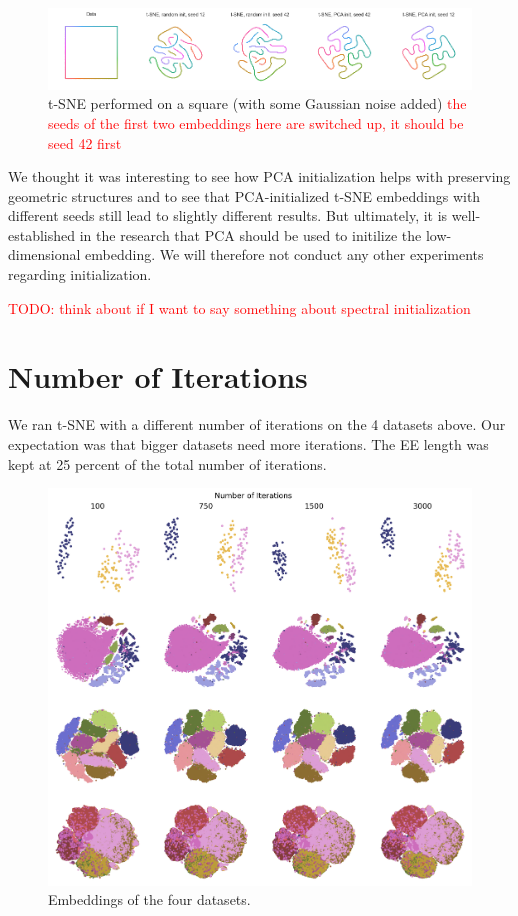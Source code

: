 \begin{figure}[h]
    \centering 
        \includegraphics[width=\linewidth]{figures/t_sne_on_square.png}
        \caption{t-SNE performed on a square (with some Gaussian noise added) \textcolor{red}{the seeds of the first two embeddings here are switched up, it should be seed 42 first}}
    \label{fig:square}
\end{figure}

We thought it was interesting to see how PCA initialization helps with preserving geometric structures and to see that PCA-initialized t-SNE embeddings with different seeds still lead to slightly different results. 
But ultimately, it is well-established in the research that PCA should be used to initilize the low-dimensional embedding. 
We will therefore not conduct any other experiments regarding initialization. 

\textcolor{red}{TODO: think about if I want to say something about spectral initialization}

\section{Number of Iterations}
We ran t-SNE with a different number of iterations on the 4 datasets above. Our expectation was that bigger datasets need more iterations. The EE length was kept at 25 percent of the total number of iterations. 

\begin{figure}[h]
    \centering 
        \includegraphics[width=\linewidth]{figures/n_iter/n_iter_embedding_grid_tab20b.png}
        \caption{Embeddings of the four datasets.}
    \label{fig:n_iter-grid}
\end{figure}

